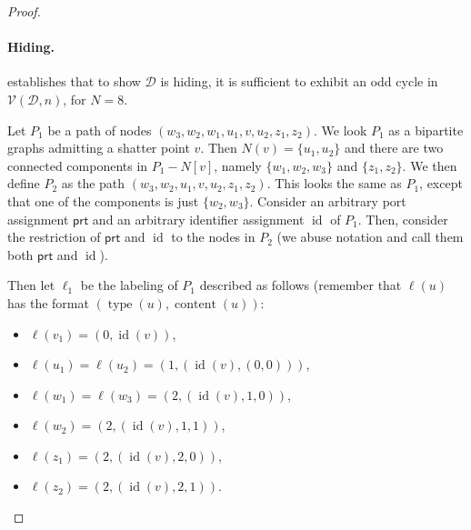 \documentclass[11pt]{article}
\DeclareMathOperator{\content}{content}
\DeclareMathOperator{\id}{id}
\DeclareMathOperator{\type}{type}
\newcommand*{\alvgd}{\mathcal{V}(\mathcal{D},n)}
\newcommand*{\ports}{\mathsf{prt}}
\begin{document}
\begin{proof}
\paragraph{Hiding.}  establishes that to show \( \mathcal{D} \) is hiding, it is sufficient to exhibit an odd cycle in \( \alvgd \), for \( N = 8 \). 

Let \( P_1 \) be a path of nodes $(w_3, w_2, w_1, u_1, v, u_2, z_1, z_2)$. We look $P_1$ as a bipartite graphs admitting a shatter point $v$. Then $N(v) = \{u_1, u_2\}$ and there are two connected components in $P_1 - N[v]$, namely $ \{w_1, w_2, w_3\}$ and $\{z_1, z_2\}$. We then define \(P_2\) as the path $(w_3, w_2, u_1, v, u_2, z_1, z_2)$. This looks the same as $P_1$, except that one of the components is just $ \{w_2, w_3\}$.  Consider an arbitrary port  assignment $\ports$ and an arbitrary identifier assignment $\id$ of $P_1$. 
Then, consider the restriction of $\ports$ and $\id$ to the nodes in $P_2$ (we abuse notation and call them both $\ports$ and $\id$).


Then let $\ell_1$ be the labeling of $P_1$ described as follows (remember that $\ell(u)$ has the format $(\type(u), \content(u))$:

\begin{multicols}{2}
\begin{itemize}
    \item $\ell(v_1) = (0,\id(v))$,
    \item $\ell(u_1) = \ell(u_2) = (1, (\id(v),(0,0)))$,
    \item $\ell(w_1) = \ell(w_3) = (2,(\id(v), 1, 0))$,
    \item $\ell(w_2) = (2, (\id(v), 1, 1))$,
    \item $\ell(z_1) = (2, (\id(v), 2, 0))$, 
    \item $\ell(z_2) = (2,(\id(v), 2, 1))$.
\end{itemize}
\end{multicols}


\end{proof}
\end{document}
